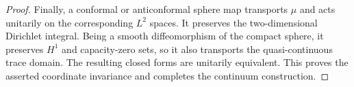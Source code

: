 \begin{proof}
Finally, a conformal or anticonformal sphere map transports $\mu$ and
acts unitarily on the corresponding $L^2$ spaces.  It preserves the
two-dimensional Dirichlet integral.  Being a smooth diffeomorphism of
the compact sphere, it preserves $H^1$ and capacity-zero sets, so it
also transports the quasi-continuous trace domain.  The resulting closed
forms are unitarily equivalent.  This proves the asserted coordinate
invariance and completes the continuum construction.
\end{proof}
